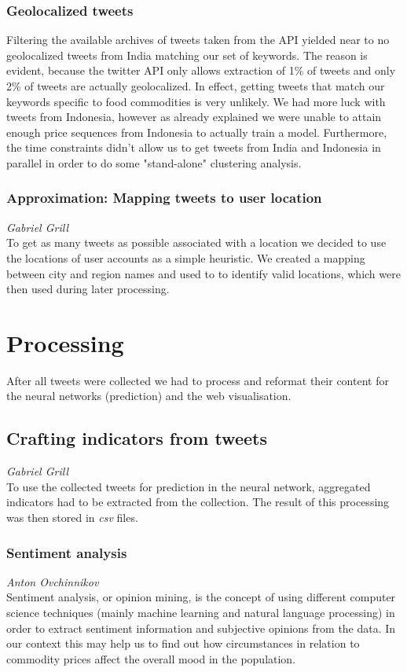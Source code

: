 \subsubsection*{Geolocalized tweets}
Filtering the available archives of tweets taken from the API yielded near to no geolocalized tweets from India matching our set of keywords. The reason is evident, because the twitter API only allows extraction of 1\% of tweets and only 2\% of tweets are actually geolocalized. In effect, getting tweets that match our keywords specific to food commodities is very unlikely. We had more luck with tweets from Indonesia, however as already explained we were unable to attain enough price sequences from Indonesia to actually train a model. Furthermore, the time constraints didn't allow us to get tweets from India and Indonesia in parallel in order to do some "stand-alone" clustering analysis.

\subsubsection*{Approximation: Mapping tweets to user location}
\emph{Gabriel Grill} \\
To get as many tweets as possible associated with a location we decided to use the locations of user accounts as a simple heuristic. We created a mapping between city and region names and used to to identify valid locations, which were then used during later processing.

\section*{Processing}
After all tweets were collected we had to process and reformat their content for the neural networks (prediction) and the web visualisation.

\subsection*{Crafting indicators from tweets}
\emph{Gabriel Grill} \\
To use the collected tweets for prediction in the neural network, aggregated indicators had to be extracted from the collection. The result of this processing was then stored in \emph{csv} files.

\subsubsection*{Sentiment analysis}
\emph{Anton Ovchinnikov} \\
Sentiment analysis, or opinion mining, is the concept of using different computer science techniques (mainly machine learning and natural language processing) in order to extract sentiment information and subjective opinions from the data. In our context this may help us to find out how circumstances in relation to commodity prices affect the overall mood in the population.

